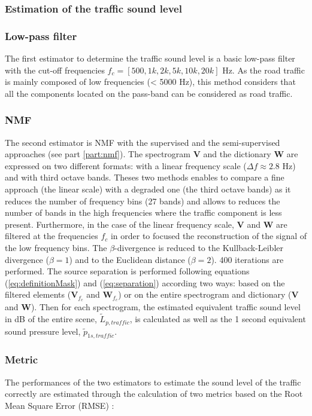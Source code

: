 \documentclass[twocolumn,a4paper,10pt]{article}
\begin{document}
\subsubsection{Estimation of the traffic sound level}
\subsubsection{Low-pass filter}
The first estimator to determine the traffic sound level is a basic low-pass filter with the cut-off frequencies $f_c = \left[ 500, 1k, 2k, 5k, 10k, 20k\right]$ Hz. As the road traffic is mainly composed of low frequencies (< 5000 Hz), this method considers that all the components located on the pass-band can be considered as road traffic. 
\subsubsection{NMF}
The second estimator is NMF with the supervised and the semi-supervised approaches (see part \ref{part:nmf}). The spectrogram $\mathbf{V}$ and the dictionary $\mathbf{W}$ are expressed on two different formats: with a linear frequency scale ($\Delta f \approx 2.8$ Hz) and with third octave bands. Theses two methods enables to compare a fine approach (the linear scale) with a degraded one (the third octave bands) as it reduces the number of frequency bins (27 bands) and allows to reduces the number of bands in the high frequencies where the traffic component is less present. Furthermore, in the case of the linear frequency scale, $\mathbf{V}$ and $\mathbf{W}$ are filtered at the frequencies $f_c$ in order to focused the reconstruction of the signal of the low frequency bins. The $\beta$-divergence is reduced to the Kullback-Leibler divergence ($\beta = 1$) and to the Euclidean distance ($\beta = 2$). 400 iterations are performed. 
The source separation is performed following equations (\ref{eq:definitionMask}) and (\ref{eq:separation}) according two ways: based on the filtered elements ($\mathbf{V}_{f_c}$ and $\mathbf{W}_{f_c}$) or on the entire spectrogram and dictionary ($\mathbf{V}$ and $\mathbf{W}$). Then for each spectrogram, the estimated equivalent traffic sound level in dB of the entire scene, $\tilde{L}_{p,traffic}$, is calculated as well as the 1 second equivalent sound pressure level, $\tilde{p}_{1s,traffic}$. 

\subsubsection{Metric}
The performances of the two estimators to estimate the sound level of the traffic correctly are estimated through the calculation of two metrics based on the Root Mean Square Error (RMSE) : 
\end{document}
